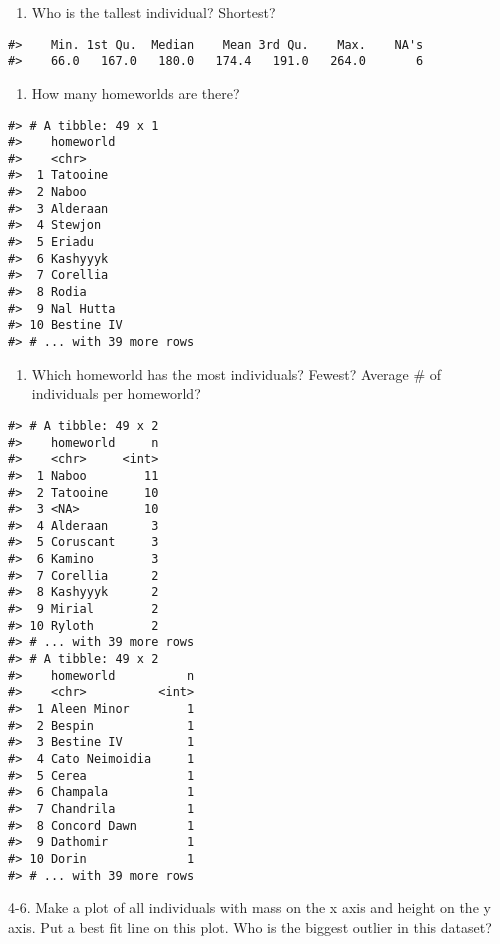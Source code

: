 \documentclass[
]{book}
\providecommand{\tightlist}{%
  \setlength{\itemsep}{0pt}\setlength{\parskip}{0pt}}
\begin{document}
\begin{enumerate}
\def\labelenumi{\arabic{enumi}.}
\tightlist
\item
  Who is the tallest individual? Shortest?
\end{enumerate}

\begin{verbatim}
#>    Min. 1st Qu.  Median    Mean 3rd Qu.    Max.    NA's 
#>    66.0   167.0   180.0   174.4   191.0   264.0       6
\end{verbatim}

\begin{enumerate}
\def\labelenumi{\arabic{enumi}.}
\setcounter{enumi}{1}
\tightlist
\item
  How many homeworlds are there?
\end{enumerate}

\begin{verbatim}
#> # A tibble: 49 x 1
#>    homeworld 
#>    <chr>     
#>  1 Tatooine  
#>  2 Naboo     
#>  3 Alderaan  
#>  4 Stewjon   
#>  5 Eriadu    
#>  6 Kashyyyk  
#>  7 Corellia  
#>  8 Rodia     
#>  9 Nal Hutta 
#> 10 Bestine IV
#> # ... with 39 more rows
\end{verbatim}

\begin{enumerate}
\def\labelenumi{\arabic{enumi}.}
\setcounter{enumi}{2}
\tightlist
\item
  Which homeworld has the most individuals? Fewest? Average \# of individuals per homeworld?
\end{enumerate}

\begin{verbatim}
#> # A tibble: 49 x 2
#>    homeworld     n
#>    <chr>     <int>
#>  1 Naboo        11
#>  2 Tatooine     10
#>  3 <NA>         10
#>  4 Alderaan      3
#>  5 Coruscant     3
#>  6 Kamino        3
#>  7 Corellia      2
#>  8 Kashyyyk      2
#>  9 Mirial        2
#> 10 Ryloth        2
#> # ... with 39 more rows
#> # A tibble: 49 x 2
#>    homeworld          n
#>    <chr>          <int>
#>  1 Aleen Minor        1
#>  2 Bespin             1
#>  3 Bestine IV         1
#>  4 Cato Neimoidia     1
#>  5 Cerea              1
#>  6 Champala           1
#>  7 Chandrila          1
#>  8 Concord Dawn       1
#>  9 Dathomir           1
#> 10 Dorin              1
#> # ... with 39 more rows
\end{verbatim}

4-6. Make a plot of all individuals with mass on the x axis and height on the y axis. Put a best fit line on this plot. Who is the biggest outlier in this dataset?
\end{document}
